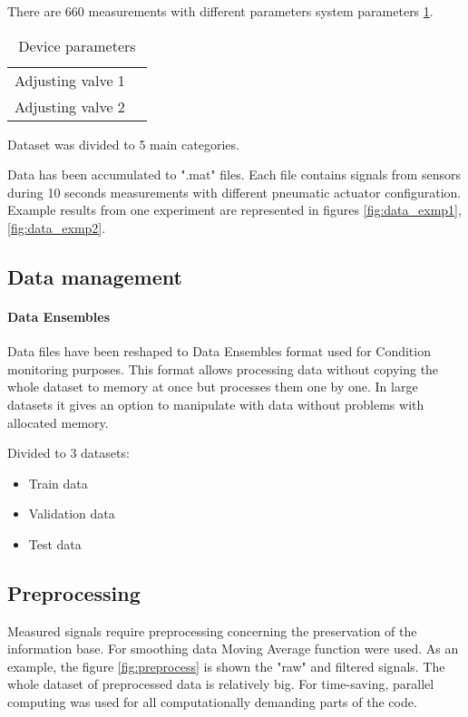 \documentclass[class=article, crop=false]{standalone}
\begin{document}
There are 660 measurements with different parameters system parameters
\ref{tab:params}.
\begin{table}[h]
    \centering
    \begin{tabular}{|c|c|}
        \hline
        Adjusting valve 1 &  \\
        Adjusting valve 2 &  \\
        \hline
    \end{tabular}
    \caption{Device parameters}
    \label{tab:params}
\end{table}

Dataset was divided to 5 main categories.


Data has been accumulated to ".mat" files.
Each file contains signals from sensors during 10 seconds measurements with
different pneumatic actuator configuration. Example results from one
experiment are represented in figures \ref{fig:data_exmp1},
\ref{fig:data_exmp2}. 


\subsection{Data management}
\paragraph{Data Ensembles}
Data files have been reshaped to Data Ensembles format used for Condition
monitoring purposes. This format allows processing data without copying the
whole dataset to memory at once but processes them one by one. In large datasets
it gives an option to manipulate with data without problems with allocated memory.

Divided to 3 datasets:
\begin{itemize}
    \item Train data
    \item Validation data
    \item Test data
\end{itemize}

\subsection{Preprocessing}
Measured signals require preprocessing concerning the preservation of the information
base. For smoothing data Moving Average function were used.
As an example, the figure \ref{fig:preprocess} is shown the "raw" and filtered signals.
The whole dataset of preprocessed data is relatively big. For
time-saving, parallel computing was used for all computationally
demanding parts of the code.
\end{document}
